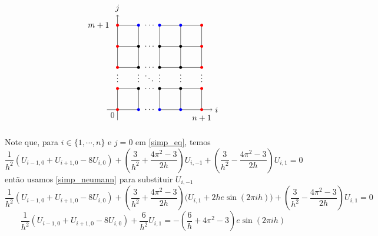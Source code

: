 \documentclass{article}
\begin{document}
    \[\begin{tikzpicture}[scale=0.9, x=1cm, y=1cm]

        \draw (1,0) -- (1,1); \draw (1,2) -- (1,4);
        \draw (2,0) -- (2,1); \draw (2,2) -- (2,4);
        \draw (3,0) -- (3,1); \draw (3,2) -- (3,4);
        \draw (4,0) -- (4,1); \draw (4,2) -- (4,4);

        \draw (0,1) -- (1,1); \draw (2,1) -- (4,1);
        \draw (0,2) -- (1,2); \draw (2,2) -- (4,2);
        \draw (0,3) -- (1,3); \draw (2,3) -- (4,3);
        \draw (0,4) -- (1,4); \draw (2,4) -- (4,4);

        \node at (1.55,0) {$\cdots$};
        \node at (1.55,1) {$\cdots$};
        \node at (1.55,2) {$\cdots$};
        \node at (1.55,3) {$\cdots$};
        \node at (1.55,4) {$\cdots$};

        \node at (0,1.6) {$\vdots$};
        \node at (1,1.6) {$\vdots$};
        \node at (2,1.6) {$\vdots$};
        \node at (3,1.6) {$\vdots$};
        \node at (4,1.6) {$\vdots$};

        \node at (1.5,1.6) {$\ddots$};

        \draw[-] (-0.5,0) -- (1,0);
        \draw[->] (2,0) -- (4+0.5,0) node[right] {$i$};
        \draw[-] (0,-0.5) -- (0,1);
        \draw[->] (0,2) -- (0,4+0.5) node[above] {$j$};

        \foreach \i in {1,2,3}
        \foreach \j in {0,4}
            \fill[blue] (\i,\j) circle (2pt);

        \foreach \i in {0,4}
        \foreach \j in {0,1,2,3,4}
            \fill[red] (\i,\j) circle (2pt);

        \foreach \i in {1,2,3}
        \foreach \j in {1,2,3}
            \fill (\i,\j) circle (2pt);


        \node at (4,-0.4) {$n+1$};
        \node at (-0.9,4) {$m+1$};
        \node[below left] at (0,0) {$0$};

    \end{tikzpicture}\]


    Note que, para $i \in \{1,\cdots,n\}$ e $j=0$ em \ref{simp_eq}, temos
    \[\frac{1}{h^2}(U_{i-1,0} + U_{i+1,0} - 8 U_{i,0}) + \left(\frac{3}{h^2} + \frac{4\pi^2 -3}{2h}\right)U_{i,-1} + \left(\frac{3}{h^2} - \frac{4\pi^2 -3}{2h}\right) U_{i,1} = 0\]
    então usamos \ref{simp_neumann} para substituir $U_{i,-1}$
    \[\frac{1}{h^2}(U_{i-1,0} + U_{i+1,0} - 8 U_{i,0}) + \left(\frac{3}{h^2} + \frac{4\pi^2 -3}{2h}\right)\Big(U_{i, 1} + 2he\sin(2\pi ih)\Big) + \left(\frac{3}{h^2} - \frac{4\pi^2 -3}{2h}\right) U_{i,1} = 0\]
    \[\frac{1}{h^2}(U_{i-1,0} + U_{i+1,0} - 8 U_{i,0}) + \frac{6}{h^2} U_{i,1} = -\left(\frac{6}{h} + 4\pi^2 -3\right)e\sin(2\pi ih)\]
\end{document}
